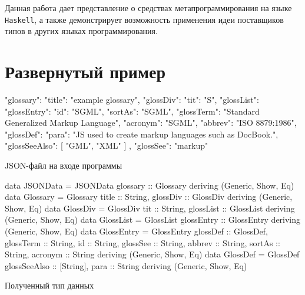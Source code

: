 Данная работа дает представление о средствах метапрограммирования на языке \lstinline{Haskell}, а также демонстрирует возможность применения идеи поставщиков типов в других языках программирования. 

\printbibliography[%
    heading=bibintoc%
]

\appendix
{}%
\chapter{Развернутый пример}

\begin{ListingEnv}[H]
\begin{Verb}
{
  "glossary": {
    "title": "example glossary",
    "glossDiv": {
      "tit": "S",
      "glossList": {
        "glossEntry": {
          "id": "SGML",
          "sortAs": "SGML",
          "glossTerm": "Standard Generalized Markup Language",
          "acronym": "SGML",
          "abbrev": "ISO 8879:1986",
          "glossDef": {
            "para": "JS used to create markup languages such as DocBook.",
            "glossSeeAlso": [
              "GML",
              "XML"
            ]
          },
          "glossSee": "markup"
        }
      }
    }
  }
}
\end{Verb}
\caption{JSON-файл на входе программы}
\label{listing:inputGreatEx}
\end{ListingEnv}

\begin{ListingEnv}[H]
\begin{Verb}
data JSONData
      = JSONData {glossary :: Glossary}
      deriving (Generic, Show, Eq)
data Glossary
      = Glossary {title :: String, glossDiv :: GlossDiv}
      deriving (Generic, Show, Eq)
data GlossDiv
      = GlossDiv {tit :: String, glossList :: GlossList}
      deriving (Generic, Show, Eq)
data GlossList
      = GlossList {glossEntry :: GlossEntry}
      deriving (Generic, Show, Eq)
data GlossEntry
      = GlossEntry {glossDef :: GlossDef,
                    glossTerm :: String,
                    id :: String,
                    glossSee :: String,
                    abbrev :: String,
                    sortAs :: String,
                    acronym :: String}
      deriving (Generic, Show, Eq)
data GlossDef
      = GlossDef {glossSeeAlso :: [String], para :: String}
      deriving (Generic, Show, Eq)
\end{Verb}
\caption{Полученный тип данных}
\label{listing:outputGreatEx}
\end{ListingEnv}


